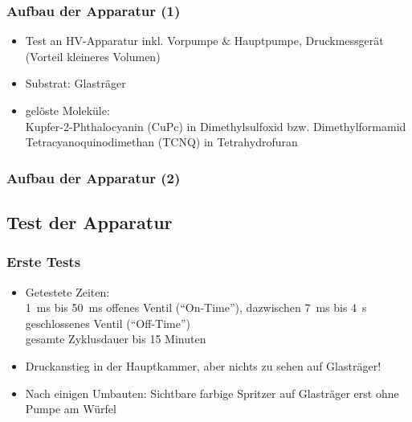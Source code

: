 \documentclass{beamer}
\begin{document}
\begin{frame}
\frametitle{Aufbau der Apparatur (1)}
\begin{itemize}\setlength{\itemsep}{+15pt}
  \item Test an HV-Apparatur inkl. Vorpumpe $\&$ Hauptpumpe, Druckmessgerät (Vorteil kleineres
  Volumen)
  \item Substrat: Glasträger
  \item gelöste Moleküle: \\
  Kupfer-2-Phthalocyanin (CuPc) in Dimethylsulfoxid bzw. Dimethylformamid\\
  Tetracyanoquinodimethan (TCNQ) in Tetrahydrofuran
\end{itemize}
\end{frame}


\begin{frame}
\frametitle{Aufbau der Apparatur (2)}
\begin{figure}[H]
\centering

\end{figure}
\end{frame}



\subsection[Ergebnisse]{Test der Apparatur}

\begin{frame}
\frametitle{Erste Tests}
\begin{itemize}\setlength{\itemsep}{+15pt}
  \item Getestete Zeiten: \\
  \SI{1}{ms} bis \SI{50}{ms} offenes Ventil ("`On-Time"'), dazwischen \SI{7}{ms} bis \SI{4}{s} geschlossenes
  Ventil ("`Off-Time"')\\ 
  gesamte Zyklusdauer bis 15 Minuten
  \item Druckanstieg in der Hauptkammer, aber nichts zu sehen auf Glasträger!
  \item Nach einigen Umbauten: Sichtbare farbige Spritzer auf Glasträger erst ohne Pumpe am Würfel
\end{itemize}
\end{frame}
\end{document}
